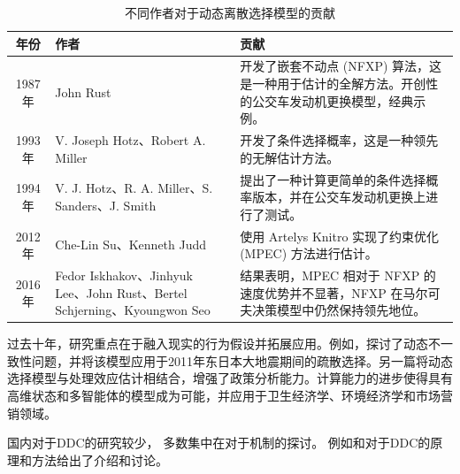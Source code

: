 \documentclass[a4paper, zihao=-4, fontset = mac, oneside]{ctexbook} %
\begin{document}
\begin{table}[!ht]
\centering
\caption{不同作者对于动态离散选择模型的贡献}
\label{tab:不同作者对于动态离散选择模型的贡献}
\begin{tabularx}{\textwidth}{@{}cXX@{}} 
\toprule
\textbf{年份} & \textbf{作者} & \textbf{贡献}\\
\midrule
1987年 &John Rust &开发了嵌套不动点 (NFXP) 算法，这是一种用于估计的全解方法。开创性的公交车发动机更换模型，经典示例。\\
1993年 &V. Joseph Hotz、Robert A. Miller &开发了条件选择概率，这是一种领先的无解估计方法。\\
1994年 &V. J. Hotz、R. A. Miller、S. Sanders、J. Smith &提出了一种计算更简单的条件选择概率版本，并在公交车发动机更换上进行了测试。\\
2012年 &Che-Lin Su、Kenneth Judd &使用 Artelys Knitro 实现了约束优化 (MPEC) 方法进行估计。 \\
2016 年 &Fedor Iskhakov、Jinhyuk Lee、John Rust、Bertel Schjerning、Kyoungwon Seo &结果表明，MPEC 相对于 NFXP 的速度优势并不显著，NFXP 在马尔可夫决策模型中仍然保持领先地位。\\
\bottomrule
\end{tabularx}
\end{table}


过去十年，研究重点在于融入现实的行为假设并拓展应用。例如，\textcite{utaraDynamicDiscreteChoice2024}探讨了动态不一致性问题，并将该模型应用于2011年东日本大地震期间的疏散选择。另一篇\textcite{heckmanDynamicDiscreteChoice2007}将动态选择模型与处理效应估计相结合，增强了政策分析能力。计算能力的进步使得具有高维状态和多智能体的模型成为可能，并应用于卫生经济学、环境经济学和市场营销领域。


国内对于DDC的研究较少，
多数集中在对于机制的探讨。
例如\textcite{QinSongDongTaiChiSanXuanZeMoXingJiQiGuJiFangFaFaZhanZongShu2010}和\textcite{MaYaQiDongTaiChiSanXuanZeMoXingDeMoNiFenXi2016}对于DDC的原理和方法给出了介绍和讨论。
\end{document}
